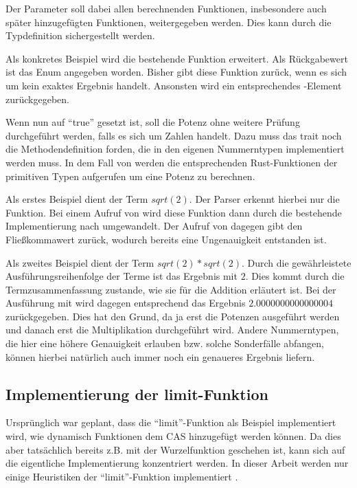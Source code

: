 \documentclass[11pt,a4paper, ngerman]{article}
\begin{document}
Der Parameter  soll dabei allen berechnenden Funktionen, insbesondere auch später hinzugefügten Funktionen, weitergegeben werden. Dies kann durch die Typdefinition  sichergestellt werden.

Als konkretes Beispiel wird die bestehende Funktion  erweitert. Als Rückgabewert ist das Enum  angegeben worden. Bisher gibt diese Funktion  zurück, wenn es sich um kein exaktes Ergebnis handelt. Ansonsten wird ein entsprechendes -Element zurückgegeben.

Wenn nun  auf ``true'' gesetzt ist, soll die Potenz ohne weitere Prüfung durchgeführt werden, falls es sich um Zahlen handelt. Dazu muss das trait  noch die Methodendefinition  forden, die in den eigenen Nummerntypen implementiert werden muss. In dem Fall von  werden die entsprechenden Rust-Funktionen der primitiven Typen aufgerufen um eine Potenz zu berechnen.

Als erstes Beispiel dient der Term $sqrt(2)$. Der Parser erkennt hierbei nur die Funktion. Bei einem Aufruf von  wird diese Funktion dann durch die bestehende Implementierung nach  umgewandelt. Der Aufruf von  dagegen gibt den Fließkommawert  zurück, wodurch bereits eine Ungenauigkeit entstanden ist.

Als zweites Beispiel dient der Term $sqrt(2)*sqrt(2)$. Durch die gewährleistete Ausführungsreihenfolge der Terme ist das Ergebnis mit  $2$. Dies kommt durch die Termzusammenfassung zustande, wie sie für die Addition erläutert ist. Bei der Ausführung mit  wird dagegen entsprechend das Ergebnis $2.0000000000000004$ zurückgegeben. Dies hat den Grund, da ja erst die Potenzen ausgeführt werden und danach erst die Multiplikation durchgeführt wird. Andere Nummerntypen, die hier eine höhere Genauigkeit erlauben bzw. solche Sonderfälle abfangen, können hierbei natürlich auch immer noch ein genaueres Ergebnis liefern.

\subsection{Implementierung der limit-Funktion}
Ursprünglich war geplant, dass die ``limit''-Funktion als Beispiel implementiert wird, wie dynamisch Funktionen dem CAS hinzugefügt werden können. Da dies aber tatsächlich bereits z.B. mit der Wurzelfunktion geschehen ist, kann sich auf die eigentliche Implementierung konzentriert werden. In dieser Arbeit werden nur einige Heuristiken der ``limit''-Funktion implementiert \cite{ListLimitHeuristic}.
\end{document}
